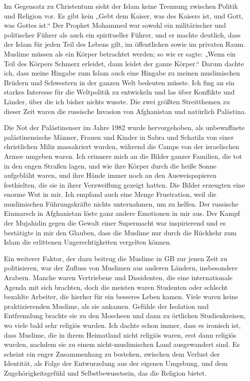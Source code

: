 \documentclass[12pt]{memoir}
\begin{document}
Im Gegensatz zu Christentum sieht der Islam
keine Trennung zwischen Politik und Religion vor.
Es gibt kein „Gebt dem Kaiser, was des Kaisers ist,
und Gott, was Gottes ist.“
Der Prophet Mohammed war sowohl ein militärischer und politischer Führer
als auch ein spiritueller Führer,
und er machte deutlich, dass der Islam für jeden Teil des Lebens gilt,
im öffentlichen sowie im privaten Raum.
Muslime müssen als ein Körper betrachtet werden; so wie er sagte:
„Wenn ein Teil des Körpers Schmerz erleidet, dann leidet der ganze Körper.“
Darum dachte ich, dass meine Hingabe zum Islam auch eine Hingabe
zu meinen muslimischen Brüdern und Schwestern in der ganzen Welt bedeuten müsste.
Ich fing an ein starkes Interesse für die Weltpolitik zu entwickeln
und las über Konflikte und Länder, über die ich bisher nichts wusste.
Die zwei größten Streitthemen zu dieser Zeit waren
die russische Invasion von Afghanistan und natürlich Palästina.

Die Not der Palästinenser im Jahre 1982 wurde hervorgehoben,
als unbewaffnete palästinensische Männer, Frauen und Kinder
in Sabra und Schatila von einer christlichen Miliz massakriert wurden,
während die Camps von der israelischen Armee umgeben waren.
Ich erinnere mich an die Bilder ganzer Familien,
die tot in den engen Straßen lagen,
und wie ihre Körper durch die heiße Sonne aufgebläht waren,
und ihre Hände immer noch an den Ausweispapieren festhielten,
die sie in ihrer Verzweiflung gezeigt hatten.
Die Bilder erzeugten eine enorme Wut in mir.
Ich empfand auch eine Menge Frustration,
weil die muslimischen Führungskräfte nichts unternahmen, um zu helfen.
Der russische Einmarsch in Afghanistan löste ganz andere Emotionen in mir aus.
Der Kampf der Mujahidin gegen die Gewalt einer Supermacht war inspirierend
und es bestätigte in mir den Glauben,
dass die Muslime nur durch die Rückkehr zum Islam
die erlittenen Ungerechtigkeiten vergelten können.

Ein weiterer Faktor, der dazu beitrug die Muslime in GB
zur jenen Zeit zu politisieren,
war der Zufluss von Muslimen aus anderen Ländern, insbesondere Arabern.
Manche waren Vertriebene und Dissidenten,
die eine internationale Agenda mit sich brachten,
doch die meisten waren Studenten oder schlecht bezahlte Arbeiter,
die hierher für ein besseres Leben kamen.
Viele waren keine praktizierenden Muslime, als sie ankamen.
Gefühle der Isolation und Entfremdung brachte sie zu den Moscheen
und dann zu örtlichen Studienkreisen, wo viele bald sehr religiös wurden.
Ich dachte schon immer, dass es ironisch ist, dass Muslime,
die in ihrem Heimatland nicht religiös waren,
erst dann religiös wurden,
nachdem sie zu einem nicht-muslimischen Land ausgewandert sind.
Es scheint ein enger Zusammenhang zu bestehen,
zwischen dem Verlust der Identität,
als Folge der Entwurzelung aus der eigenen Umgebung,
und dem Zugehörigkeitsgefühl und Selbstbewusstsein, das die Religion bietet.
\end{document}
